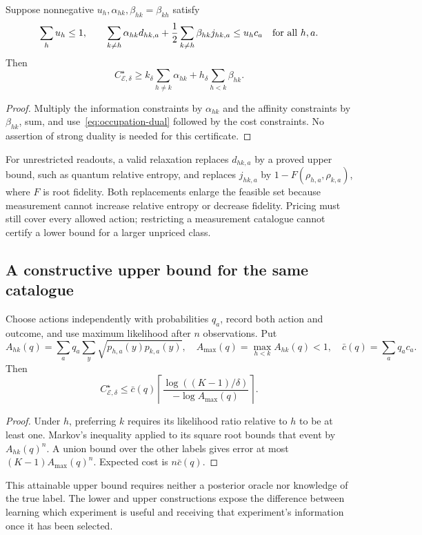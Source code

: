 \begin{corollary}
\label{cor:occupation-dual}
Suppose nonnegative $u_h,\alpha_{hk},\beta_{hk}=\beta_{kh}$ satisfy
\begin{equation}\label{eq:occupation-dual}
 \sum_hu_h\leq1,\qquad
 \sum_{k\ne h}\alpha_{hk}d_{hk,a}
 +\frac12\sum_{k\ne h}\beta_{hk}j_{hk,a}\leq u_hc_a
 \quad\hbox{for all }h,a.
\end{equation}
Then
\[
 C_{\mathcal E,\delta}^\star\geq
 k_\delta\sum_{h\ne k}\alpha_{hk}
 +h_\delta\sum_{h<k}\beta_{hk}.
\]
\end{corollary}
\begin{proof}
Multiply the information constraints by $\alpha_{hk}$ and the affinity
constraints by $\beta_{hk}$, sum, and use~\eqref{eq:occupation-dual}
followed by the cost constraints. No assertion of strong duality is
needed for this certificate.
\end{proof}
For unrestricted readouts, a valid relaxation replaces $d_{hk,a}$ by
a proved upper bound, such as quantum relative entropy, and replaces
$j_{hk,a}$ by $1-F(\rho_{h,a},\rho_{k,a})$, where $F$ is root fidelity.
Both replacements enlarge the feasible set because measurement cannot
increase relative entropy or decrease fidelity. Pricing must still cover
every allowed action; restricting a measurement catalogue cannot certify
a lower bound for a larger unpriced class.

\subsection{A constructive upper bound for the same catalogue}
\begin{proposition}\label{prop:catalogue-upper}
Choose actions independently with probabilities $q_a$, record both action
and outcome, and use maximum likelihood after $n$ observations. Put
\[
 A_{hk}(q)=\sum_aq_a\sum_y\sqrt{p_{h,a}(y)p_{k,a}(y)},\quad
 A_{\max}(q)=\max_{h<k}A_{hk}(q)<1,\quad
 \bar c(q)=\sum_aq_ac_a.
\]
Then
\begin{equation}\label{eq:catalogue-upper}
 C_{\mathcal E,\delta}^\star\leq
 \bar c(q)\left\lceil
 \frac{\log((K-1)/\delta)}{-\log A_{\max}(q)}\right\rceil.
\end{equation}
\end{proposition}
\begin{proof}
Under $h$, preferring $k$ requires its likelihood ratio relative to $h$
to be at least one. Markov's inequality applied to its square root
bounds that event by $A_{hk}(q)^n$. A union bound over the other labels
gives error at most $(K-1)A_{\max}(q)^n$. Expected cost is $n\bar c(q)$.
\end{proof}
This attainable upper bound requires neither a posterior oracle nor
knowledge of the true label. The lower and upper constructions expose
the difference between learning which experiment is useful and receiving
that experiment's information once it has been selected.

